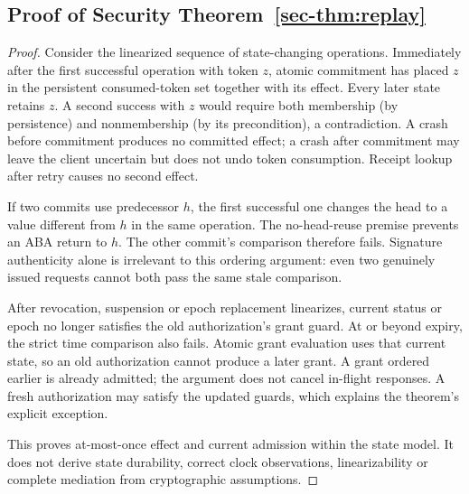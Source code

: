 \subsection{Proof of Security Theorem~\ref{sec-thm:replay}}
\begin{proof}
Consider the linearized sequence of state-changing operations. Immediately
after the first successful operation with token $z$, atomic commitment has
placed $z$ in the persistent consumed-token set together with its effect.
Every later state retains $z$. A second success with $z$ would require both
membership (by persistence) and nonmembership (by its precondition), a
contradiction. A crash before commitment produces no committed effect; a
crash after commitment may leave the client uncertain but does not undo
token consumption. Receipt lookup after retry causes no second effect.

If two commits use predecessor $h$, the first successful one changes the
head to a value different from $h$ in the same operation. The no-head-reuse
premise prevents an ABA return to $h$. The other commit's comparison
therefore fails. Signature authenticity alone is irrelevant to this
ordering argument: even two genuinely issued requests cannot both pass
the same stale comparison.

After revocation, suspension or epoch replacement linearizes, current
status or epoch no longer satisfies the old authorization's grant guard.
At or beyond expiry, the strict time comparison also fails. Atomic grant
evaluation uses that current state, so an old authorization cannot produce
a later grant. A grant ordered earlier is already admitted; the argument
does not cancel in-flight responses. A fresh authorization may satisfy
the updated guards, which explains the theorem's explicit exception.

This proves at-most-once effect and current admission within the state
model. It does not derive state durability, correct clock observations,
linearizability or complete mediation from cryptographic assumptions.
\end{proof}

